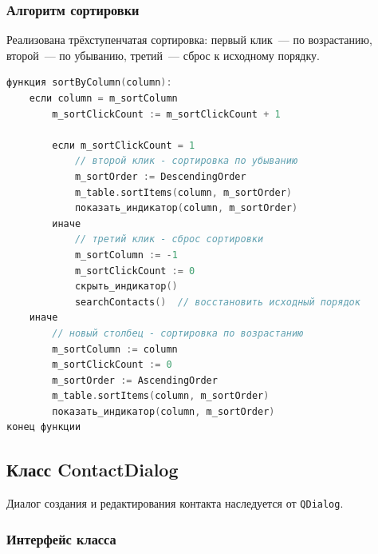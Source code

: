 \subsubsection*{Алгоритм сортировки}

Реализована трёхступенчатая сортировка: первый клик~--- по возрастанию, второй~--- по убыванию, третий~--- сброс к исходному порядку.

\begin{lstlisting}[language=C, caption=Функция sortByColumn]
функция sortByColumn(column):
    если column = m_sortColumn
        m_sortClickCount := m_sortClickCount + 1
        
        если m_sortClickCount = 1
            // второй клик - сортировка по убыванию
            m_sortOrder := DescendingOrder
            m_table.sortItems(column, m_sortOrder)
            показать_индикатор(column, m_sortOrder)
        иначе
            // третий клик - сброс сортировки
            m_sortColumn := -1
            m_sortClickCount := 0
            скрыть_индикатор()
            searchContacts()  // восстановить исходный порядок
    иначе
        // новый столбец - сортировка по возрастанию
        m_sortColumn := column
        m_sortClickCount := 0
        m_sortOrder := AscendingOrder
        m_table.sortItems(column, m_sortOrder)
        показать_индикатор(column, m_sortOrder)
конец функции
\end{lstlisting}

\subsection{Класс ContactDialog}

Диалог создания и редактирования контакта наследуется от \texttt{QDialog}.

\subsubsection*{Интерфейс класса}

